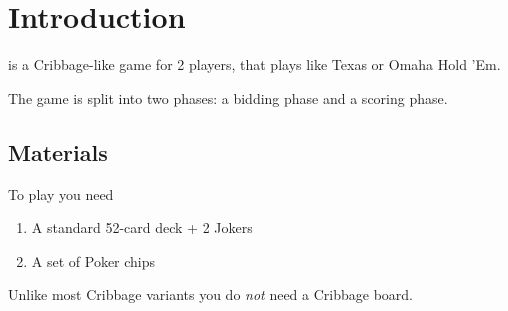 \section{Introduction}

\name{} is a Cribbage-like game for 2 players, that plays like Texas or Omaha Hold 'Em.

The game is split into two phases: a bidding phase and a scoring phase. 

\subsection{Materials}
To play \name{} you need

\begin{enumerate}
    \item A standard 52-card deck + 2 Jokers
    \item A set of Poker chips
\end{enumerate}

\note Unlike most Cribbage variants you do \textit{not} need a Cribbage board.